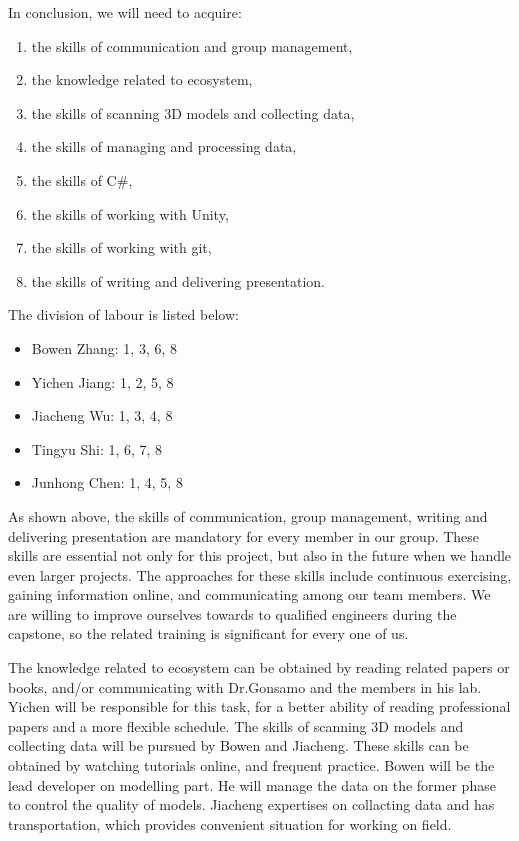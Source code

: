 \documentclass{article}
\begin{document}
In conclusion, we will need to acquire: 
\begin{enumerate}
    \item the skills of communication and group management,
    \item the knowledge related to ecosystem,
    \item the skills of scanning 3D models and collecting data,
    \item the skills of managing and processing data,
    \item the skills of C\#,
    \item the skills of working with Unity,
    \item the skills of working with git,
    \item the skills of writing and delivering presentation.
\end{enumerate}

The division of labour is listed below:
\begin{itemize}
    \item Bowen Zhang: 1, 3, 6, 8
    \item Yichen Jiang: 1, 2, 5, 8
    \item Jiacheng Wu: 1, 3, 4, 8
    \item Tingyu Shi: 1, 6, 7, 8
    \item Junhong Chen: 1, 4, 5, 8
\end{itemize}

As shown above, the skills of communication, group management, writing and delivering presentation are mandatory for every member in our group. These skills are essential not only for this project, but also in the future when we handle even larger projects. The approaches for these skills include continuous exercising, gaining information online, and communicating among our team members. We are willing to improve ourselves towards to qualified engineers during the capstone, so the related training is significant for every one of us. 

The knowledge related to ecosystem can be obtained by reading related papers or books, and/or communicating with Dr.Gonsamo and the members in his lab. Yichen will be responsible for this task, for a better ability of reading professional papers and a more flexible schedule. 
The skills of scanning 3D models and collecting data will be pursued by Bowen and Jiacheng. These skills can be obtained by watching tutorials online, and frequent practice. Bowen will be the lead developer on modelling part. He will manage the data on the former phase to control the quality of models. Jiacheng expertises on collacting data and has transportation, which provides convenient situation for working on field.
\end{document}
